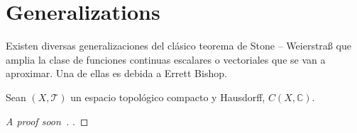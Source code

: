 \section{Generalizations}

\begin{frame}
	Existen diversas \alert{generalizaciones} del clásico teorema de
	Stone – Weierstraß que amplia la clase de funciones continuas
	escalares o vectoriales que se van a aproximar.
	Una de ellas es debida a Errett Bishop.

	\begin{theorem}
		Sean $\left(X, \mathcal{T}\right)$ un espacio topológico
		compacto y Hausdorff, $C\left(X,\mathds{C}\right)$.
	\end{theorem}

	\begin{proof}[\alert{A proof soon}~\cite{Rudin1991}]
		.
	\end{proof}
\end{frame}